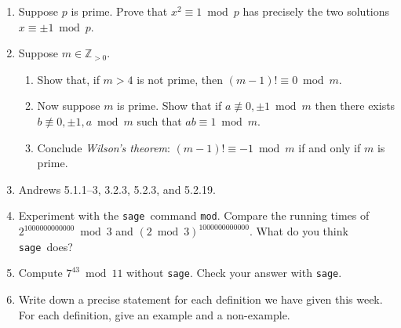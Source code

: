 \documentclass[11pt]{article}
\def\Z{\mathbb{Z}}
\def\sage{{\tt sage}}
\begin{document}
\begin{enumerate}
\item Suppose $p$ is prime.
Prove that $x^2 \equiv 1 \bmod p$ has precisely the two solutions $x \equiv \pm 1 \bmod p$.

\item Suppose $m \in \Z_{ >0 }$.
  \begin{enumerate}
  \item Show that, if $m>4$ is not prime, then $(m-1)! \equiv 0 \bmod m$.
  \item Now suppose $m$ is prime. Show that if $a \not\equiv 0, \pm 1 \bmod m$ then there exists $b \not\equiv 0, \pm 1, a \bmod m$ such that $ab \equiv 1 \bmod m$.
  \item Conclude \emph{Wilson's theorem}: $(m-1)! \equiv -1 \bmod m$ if and only if $m$ is prime.
  \end{enumerate}

\item Andrews 5.1.1--3, 3.2.3, 5.2.3, and 5.2.19.

\item Experiment with the \sage \ command {\tt mod}.
Compare the running times of $2^{1000000000000} \bmod 3$ and $(2 \bmod 3)^{1000000000000}$.
What do you think \sage \ does?

\item Compute $7^{ 43 } \bmod 11$ without \sage. Check your answer with \sage.

\item Write down a precise statement for each definition we have given this week.
For each definition, give an example and a non-example.

\end{enumerate}
\end{document}
